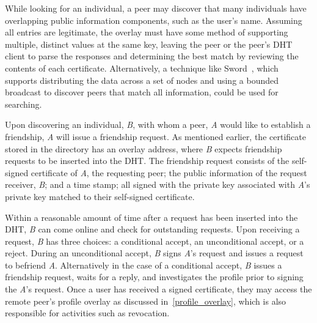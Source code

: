 \documentclass[letterpaper,twocolumn,10pt]{article}
\begin{document}
While looking for an individual, a peer may discover that many individuals have
overlapping public information components, such as the user's name.  Assuming
all entries are legitimate, the overlay must have some method of supporting
multiple, distinct values at the same key, leaving the peer or the peer's DHT
client to parse the responses and determining the best match by reviewing the
contents of each certificate.  Alternatively, a technique like
Sword~\cite{sword}, which supports distributing the data across a set of nodes
and using a bounded broadcast to discover peers that match all information,
could be used for searching.

Upon discovering an individual, \textit{B}, with whom a peer, \textit{A} would
like to establish a friendship, \textit{A} will issue a friendship request.
As mentioned earlier, the certificate stored in the directory has an overlay
address, where \textit{B} expects friendship requests to be inserted into the
DHT.  The friendship request consists of the self-signed certificate of
\textit{A}, the requesting peer; the public information of the request receiver,
\textit{B}; and a time stamp; all signed with the private key associated with 
\textit{A}'s private key matched to their self-signed certificate.

Within a reasonable amount of time after a request has been inserted into the
DHT, \textit{B} can come online and check for outstanding requests.  Upon
receiving a request, \textit{B} has three choices: a conditional accept, an
unconditional accept, or a reject.  During an unconditional accept, \textit{B}
signs \textit{A}'s request and issues a request to befriend \textit{A}.
Alternatively in the case of a conditional accept, \textit{B} issues a friendship
request, waits for a reply, and investigates the profile prior to signing the
\textit{A}'s request.  Once a user has received a signed certificate,
they may access the remote peer's profile overlay as discussed
in~\ref{profile_overlay}, which is also responsible for activities such as
revocation.

\end{document}
